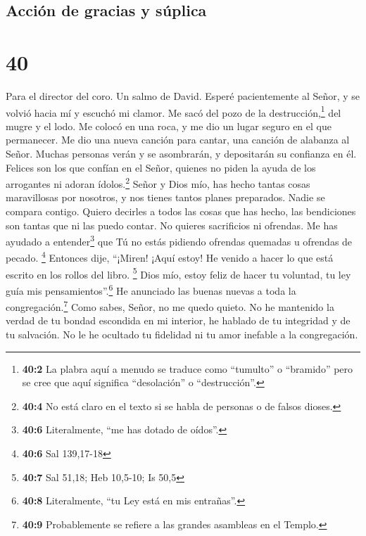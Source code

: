 \hypertarget{acciuxf3n-de-gracias-y-suxfaplica}{%
\subsection{Acción de gracias y
súplica}\label{acciuxf3n-de-gracias-y-suxfaplica}}

\hypertarget{section-39}{%
\section{40}\label{section-39}}

Para el director del coro. Un salmo de David.  Esperé
pacientemente al Señor, y se volvió hacia mí y escuchó mi clamor.
 Me sacó del pozo de la destrucción,\footnote{\textbf{40:2}
  La plabra aquí a menudo se traduce como ``tumulto'' o ``bramido'' pero
  se cree que aquí significa ``desolación'' o ``destrucción''.} del
mugre y el lodo. Me colocó en una roca, y me dio un lugar seguro en el
que permanecer.  Me dio una nueva canción para cantar, una
canción de alabanza al Señor. Muchas personas verán y se asombrarán, y
depositarán su confianza en él.  Felices son los que
confían en el Señor, quienes no piden la ayuda de los arrogantes ni
adoran ídolos.\footnote{\textbf{40:4} No está claro en el texto si se
  habla de personas o de falsos dioses.}  Señor y Dios
mío, has hecho tantas cosas maravillosas por nosotros, y nos tienes
tantos planes preparados. Nadie se compara contigo. Quiero decirles a
todos las cosas que has hecho, las bendiciones son tantas que ni las
puedo contar.  No quieres sacrificios ni ofrendas. Me has
ayudado a entender\footnote{\textbf{40:6} Literalmente, ``me has dotado
  de oídos''.} que Tú no estás pidiendo ofrendas quemadas u ofrendas de
pecado. \footnote{\textbf{40:6} Sal 139,17-18}  Entonces
dije, ``¡Miren! ¡Aquí estoy! He venido a hacer lo que está escrito en
los rollos del libro. \footnote{\textbf{40:7} Sal 51,18; Heb 10,5-10; Is
  50,5}  Dios mío, estoy feliz de hacer tu voluntad, tu
ley guía mis pensamientos''.\footnote{\textbf{40:8} Literalmente, ``tu
  Ley está en mis entrañas''.}  He anunciado las buenas
nuevas a toda la congregación.\footnote{\textbf{40:9} Probablemente se
  refiere a las grandes asambleas en el Templo.} Como sabes, Señor, no
me quedo quieto.  No he mantenido la verdad de tu bondad
escondida en mi interior, he hablado de tu integridad y de tu salvación.
No le he ocultado tu fidelidad ni tu amor inefable a la congregación.
